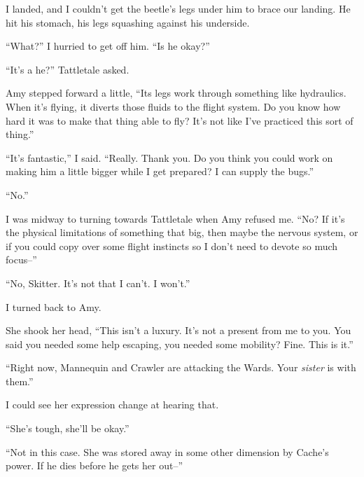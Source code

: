 I landed, and I couldn't get the beetle's legs under him to brace our landing.  He hit his stomach, his legs squashing against his underside.



``What?'' I hurried to get off him.  ``Is he okay?''



``It's a he?''  Tattletale asked.



Amy stepped forward a little, ``Its legs work through something like hydraulics.  When it's flying, it diverts those fluids to the flight system.  Do you know how hard it was to make that thing able to fly?  It's not like I've practiced this sort of thing.''



``It's fantastic,'' I said.  ``Really.  Thank you.  Do you think you could work on making him a little bigger while I get prepared?  I can supply the bugs.''



``No.''



I was midway to turning towards Tattletale when Amy refused me.  ``No?  If it's the physical limitations of something that big, then maybe the nervous system, or if you could copy over some flight instincts so I don't need to devote so much focus--''



``No, Skitter.  It's not that I can't.  I won't.''



I turned back to Amy.



She shook her head, ``This isn't a luxury.  It's not a present from me to you.  You said you needed some help escaping, you needed some mobility?  Fine.  This is it.''



``Right now, Mannequin and Crawler are attacking the Wards.  Your \emph{sister} is with them.''



I could see her expression change at hearing that.



``She's tough, she'll be okay.''



``Not in this case.  She was stored away in some other dimension by Cache's power.  If he dies before he gets her out--''



